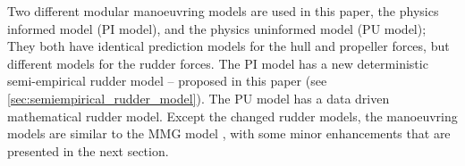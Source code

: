 Two different modular manoeuvring models are used in this paper, the physics informed model (PI model), and the physics uninformed model (PU model); They both have identical prediction models for the hull and propeller forces, but different models for the rudder forces. The PI model has a new deterministic semi-empirical rudder model -- proposed in this paper (see \autoref{sec:semiempirical_rudder_model}). The PU model has a data driven mathematical rudder model. 
Except the changed rudder models, the manoeuvring models are similar to the MMG model \citep{yasukawa_introduction_2015}, with some minor enhancements that are presented in the next section.
